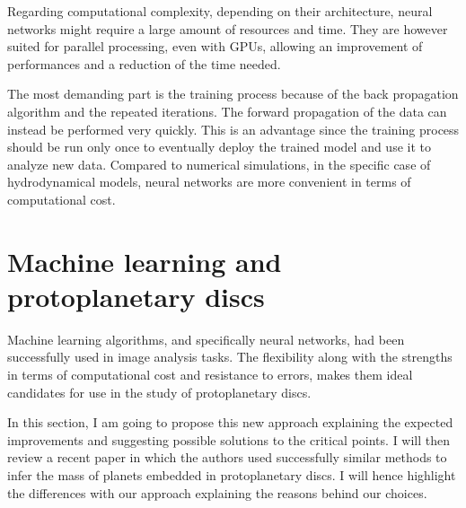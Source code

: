 \documentclass[a4paper,10pt]{report}
\begin{document}

Regarding computational complexity, depending on their architecture, neural networks might require a
large amount of resources and time. They are however suited for parallel processing, even with GPUs, allowing
an improvement of performances and a reduction of the time needed.

The most demanding part is the training process because of the back propagation 
algorithm and the repeated iterations.
The forward propagation of the data can instead be performed  very quickly.
This is an advantage since the training process should be run only once to eventually deploy the trained model
and use it to analyze new data. Compared to numerical simulations, in the specific case of hydrodynamical models, 
neural networks are more convenient in terms of computational cost.

\section{Machine learning and protoplanetary discs}

Machine learning algorithms, and specifically neural networks, had been successfully used in image analysis tasks.
The flexibility along with the strengths in terms of computational cost and resistance to 
errors, makes them ideal candidates for use in the study of protoplanetary discs.

In this section, I am going to propose this new approach explaining the expected improvements and 
suggesting possible solutions to the critical points. I will then review a recent paper in which the 
authors used successfully similar methods to infer the mass of planets embedded in protoplanetary discs.
I will hence highlight the differences with our approach explaining the reasons behind our choices.
\end{document}
